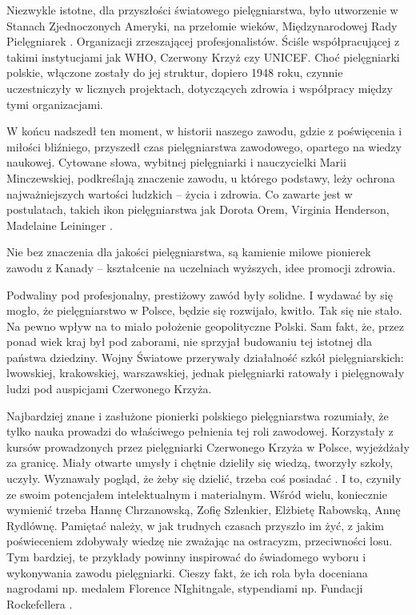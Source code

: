 \documentclass[a4paper,12pt,twoside,openright]{mwrep}
\begin{document}
Niezwykle istotne, dla przyszłości światowego pielęgniarstwa, było utworzenie w Stanach Zjednoczonych Ameryki, na przełomie wieków, Międzynarodowej Rady Pielęgniarek \cite{rada}. Organizacji zrzeszającej profesjonalistów. Ściśle współpracującej z takimi instytucjami jak WHO, Czerwony Krzyż czy UNICEF. Choć pielęgniarki polskie, włączone zostały do jej struktur, dopiero 1948 roku, czynnie uczestniczyły w licznych projektach, dotyczących zdrowia i współpracy między tymi organizacjami.

W końcu nadszedł ten moment, w historii naszego zawodu, gdzie z poświęcenia i miłości bliźniego, przyszedł czas pielęgniarstwa zawodowego, opartego na wiedzy naukowej. Cytowane słowa, wybitnej pielęgniarki i nauczycielki Marii Minczewskiej, podkreślają znaczenie zawodu, u którego podstawy, leży  ochrona najważniejszych wartości ludzkich – życia i zdrowia.  Co zawarte jest w postulatach, takich ikon pielęgniarstwa jak Dorota Orem, Virginia Henderson, Madelaine Leininger \cite{ikon}.

Nie bez znaczenia dla jakości pielęgniarstwa, są kamienie milowe pionierek zawodu z Kanady – kształcenie na uczelniach wyższych, idee promocji zdrowia.

Podwaliny pod profesjonalny, prestiżowy zawód były solidne. I wydawać by się mogło, że pielęgniarstwo w Polsce, będzie się rozwijało, kwitło. Tak się nie stało. Na pewno wpływ na to miało położenie geopolityczne Polski. Sam fakt, że, przez ponad wiek kraj był pod zaborami, nie sprzyjał budowaniu tej istotnej dla państwa dziedziny. Wojny Światowe przerywały działalność szkół pielęgniarskich: lwowskiej, krakowskiej, warszawskiej, jednak pielęgniarki ratowały i pielęgnowały ludzi pod auspicjami Czerwonego Krzyża.

Najbardziej znane i zasłużone pionierki polskiego pielęgniarstwa rozumiały, że tylko nauka prowadzi do właściwego pełnienia tej roli zawodowej. Korzystały z kursów prowadzonych przez pielęgniarki Czerwonego Krzyża  w Polsce, wyjeżdżały za granicę. Miały otwarte umysły i chętnie dzieliły się wiedzą, tworzyły szkoły, uczyły.  Wyznawały pogląd, że żeby się dzielić, trzeba coś posiadać \cite{ikonpol}. I to, czyniły ze swoim potencjałem intelektualnym i materialnym. Wśród wielu, koniecznie wymienić trzeba Hannę Chrzanowską, Zofię Szlenkier, Elżbietę Rabowską, Annę Rydlównę. Pamiętać należy, w jak trudnych czasach przyszło im żyć, z jakim poświeceniem zdobywały wiedzę nie zważając na ostracyzm, przeciwności losu. Tym bardziej, te przykłady powinny inspirować do świadomego wyboru i wykonywania zawodu pielęgniarki. Cieszy fakt, że ich rola była doceniana nagrodami np. medalem Florence NIghitngale, stypendiami np. Fundacji Rockefellera \cite{50}.
\end{document}

